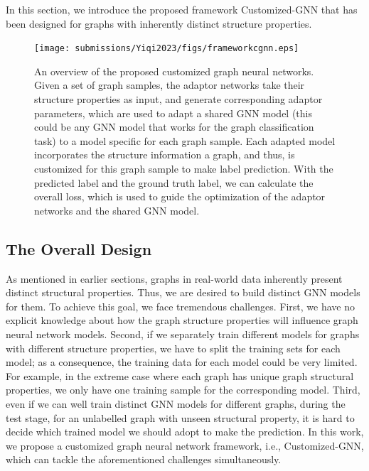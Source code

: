 \documentclass[11pt,dvipdfm]{article}
\begin{document}
In this section, we introduce the proposed framework Customized-GNN that has been designed for graphs with inherently distinct structure properties. 
\begin{figure}[!t]
\begin{center}
{\texttt{[image: submissions/Yiqi2023/figs/frameworkcgnn.eps]}}

\end{center}

\caption{An overview of the proposed customized graph neural networks. Given a set of graph samples, the adaptor networks take their structure properties as input, and generate corresponding adaptor parameters, which are used to adapt a shared GNN model (this could be any GNN model that works for the graph classification task) to a model specific for each graph sample. Each adapted model incorporates the structure information a graph, and thus, is customized for this graph sample to make label prediction. With the predicted label and the ground truth label, we can calculate the overall loss, which is used to guide the optimization of the adaptor networks and the shared GNN model.}

\label{fig:model-frame}

\end{figure}

\subsection{The Overall Design}

As mentioned in earlier sections, graphs in real-world data inherently present distinct structural properties. Thus, we are desired to build distinct GNN models for them. To achieve this goal, we face tremendous challenges. First, we have no explicit knowledge about how the graph structure properties will influence graph neural network models. Second, if we separately train different models for graphs with different structure properties, we have to split the training sets for each model; as a consequence, the training data for each model could be very limited. For example, in the extreme case where each graph has unique graph structural properties, we only have one training sample for the corresponding model. Third, even if we can well train distinct GNN models for different graphs, during the test stage, for an unlabelled graph with unseen structural property, it is hard to decide which trained model we should adopt to make the prediction. In this work, we propose a customized graph neural network framework, i.e., Customized-GNN, which can tackle the aforementioned challenges simultaneously. 
\end{document}
